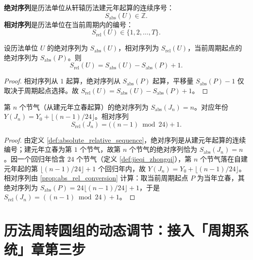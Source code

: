 \begin{definition}[绝对序列与相对序列]\label{def:absolute_relative_sequence}
\textbf{绝对序列}是历法单位从轩辕历法建元年起算的连续序号：
\[
S_{\text{abs}}(U)\in\mathbb Z.
\]
\textbf{相对序列}是历法单位在当前周期内的编号：
\[
S_{\text{rel}}(U)\in\{1,2,\dots,T\}.
\]
\end{definition}

\begin{proposition}[绝对序列与相对序列的转换]\label{prop:abs_rel_conversion}
设历法单位 \(U\) 的绝对序列为 \(S_{\text{abs}}(U)\)，相对序列为 \(S_{\text{rel}}(U)\)，当前周期起点的绝对序列为 \(S_{\text{abs}}(P)\)。则
\[
S_{\text{rel}}(U)=S_{\text{abs}}(U)-S_{\text{abs}}(P)+1.
\]
\end{proposition}

\begin{proof}
相对序列从 \(1\) 起算，绝对序列从 \(S_{\text{abs}}(P)\) 起算，平移量 \(S_{\text{abs}}(P)-1\) 仅取决于周期起点选择。故 \(S_{\text{rel}}(U)=S_{\text{abs}}(U)-S_{\text{abs}}(P)+1\)。
\end{proof}

\begin{proposition}[节气的绝对序列计算]\label{prop:jieqi_absolute_sequence}
第 \(n\) 个节气（从建元年立春起算）的绝对序列为 \(S_{\text{abs}}(J_n)=n\)。对应年份 \(Y(J_n)=Y_0+\lfloor (n-1)/24\rfloor\)。相对序列
\[
S_{\text{rel}}(J_n)=\bigl((n-1)\bmod 24\bigr)+1.
\]
\end{proposition}

\begin{proof}
由定义 \ref{def:absolute_relative_sequence}，绝对序列是从建元年起算的连续编号；建元年立春为第 \(1\) 个节气，故第 \(n\) 个节气的绝对序列恰为 \(S_{\text{abs}}(J_n)=n\)。因一个回归年恰含 \(24\) 个节气（定义 \ref{def:jieqi_zhongqi}），第 \(n\) 个节气落在自建元年起的第 \(\lfloor (n-1)/24\rfloor+1\) 个回归年内，故 \(Y(J_n)=Y_0+\lfloor (n-1)/24\rfloor\)。相对序列由 \cref{prop:abs_rel_conversion} 计算：取当前周期起点 \(P\) 为当年立春，其绝对序列为 \(S_{\text{abs}}(P)=24\lfloor (n-1)/24\rfloor+1\)，于是 \(S_{\text{rel}}(J_n)=((n-1)\bmod 24)+1\)。
\end{proof}

\section{历法周转圆组的动态调节：接入「周期系统」章第三步}
\label{sec:calendar_adaptive}

